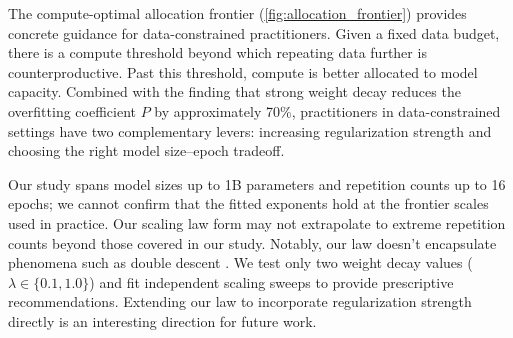 

 The compute-optimal allocation frontier (\autoref{fig:allocation_frontier}) provides concrete guidance for data-constrained practitioners. Given a fixed data budget, there is a compute threshold beyond which repeating data further is counterproductive. Past this threshold, compute is better allocated to model capacity. Combined with the finding that strong weight decay reduces the overfitting coefficient $P$ by approximately 70\%, practitioners in data-constrained settings have two complementary levers: increasing regularization strength and choosing the right model size--epoch tradeoff.

 Our study spans model sizes up to 1B parameters and repetition counts up to 16 epochs; we cannot confirm that the fitted exponents hold at the frontier scales used in practice. Our scaling law form may not extrapolate to extreme repetition counts beyond those covered in our study. Notably, our law doesn't encapsulate phenomena such as double descent \citep{Nakkiran2020Deep}. We test only two weight decay values ($\lambda \in \{0.1, 1.0\}$) and fit independent scaling sweeps to provide prescriptive recommendations. Extending our law to incorporate regularization strength directly is an interesting direction for future work.
